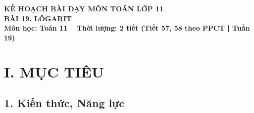 \documentclass[12pt, a4paper]{article}
\begin{document}
\begin{center}
    {\fontsize{14pt}{17pt}\selectfont \textbf{KẾ HOẠCH BÀI DẠY MÔN TOÁN LỚP 11}}\\[6pt]
    {\fontsize{16pt}{19pt}\selectfont \textbf{BÀI 19. LÔGARIT}}\\[4pt]
    {\fontsize{12pt}{15pt}\selectfont \textbf{Môn học: Toán 11} \ \textbar \ \textbf{Thời lượng: 2 tiết (Tiết 57, 58 theo PPCT | Tuần 19)}}
\end{center}

\vspace{5pt}

\section*{I. MỤC TIÊU}

\subsection*{1. Kiến thức, Năng lực}
\end{document}
